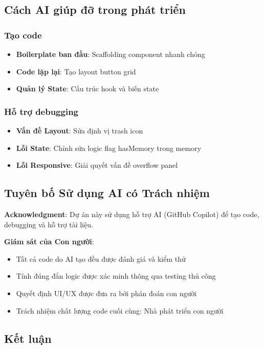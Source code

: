 \subsection{Cách AI giúp đỡ trong phát triển}

\subsubsection{Tạo code}
\begin{itemize}
    \item \textbf{Boilerplate ban đầu}: Scaffolding component nhanh chóng
    \item \textbf{Code lặp lại}: Tạo layout button grid
    \item \textbf{Quản lý State}: Cấu trúc hook và biến state
\end{itemize}

\subsubsection{Hỗ trợ debugging}
\begin{itemize}
    \item \textbf{Vấn đề Layout}: Sửa định vị trash icon
    \item \textbf{Lỗi State}: Chỉnh sửa logic flag hasMemory trong memory
    \item \textbf{Lỗi Responsive}: Giải quyết vấn đề overflow panel
\end{itemize}

\subsection{Tuyên bố Sử dụng AI có Trách nhiệm}

\textbf{Acknowledgment}: Dự án này sử dụng hỗ trợ AI (GitHub Copilot) để tạo code, debugging và hỗ trợ tài liệu.

\textbf{Giám sát của Con người}:
\begin{itemize}
    \item Tất cả code do AI tạo đều được đánh giá và kiểm thử
    \item Tính đúng đắn logic được xác minh thông qua testing thủ công
    \item Quyết định UI/UX được đưa ra bởi phán đoán con người
    \item Trách nhiệm chất lượng code cuối cùng: Nhà phát triển con người
\end{itemize}

\subsection{Kết luận}

